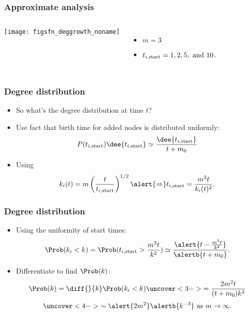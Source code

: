 \begin{frame}[label=]
 \frametitle{Approximate analysis}  

 \begin{columns}
   \texttt{[image: figsfn\_deggrowth\_noname]}
   \begin{itemize}
   \item $m = 3$
   \item $t_{i,\textnormal{start}} = 1, 2, 5, \mbox{\ and\ } 10$.
   \end{itemize}
 \end{columns}

\end{frame}

\begin{frame}[label=]
 \frametitle{Degree distribution}
 
 \begin{itemize}
 \item<1-> 
   So what's the \alert{degree distribution} at time $t$?
 \item<2-> 
   Use fact that birth time for added nodes
   is distributed uniformly:
   $$
   P(t_{i,\textnormal{start}}) \dee{t_{i,\textnormal{start}}}
   \simeq
   \frac{\dee{t_{i,\textnormal{start}}}}
   {t+m_0}
   $$
 \item<3->
   Using
   $$
   k_i(t) 
   = 
   m 
   \left(
   \frac{t}{t_{i,\textnormal{start}}}
   \right)^{1/2}
   \alert{\Rightarrow}
   t_{i,\textnormal{start}}
   = \frac{m^2 t}{k_i(t)^2}.
   $$

 \end{itemize}

\end{frame}

\begin{frame}[label=]
  \frametitle{Degree distribution}

  \begin{itemize}
  \item<1-> 
    Using the uniformity of start times:
    $$
    \Prob(k_i < k)
    =
    \Prob(t_{i,\textnormal{start}} > \frac{m^2 t}{k^2})
    \simeq
    \frac{\alert{t-\frac{m^2 t}{k^2}}}{\alertb{t+m_0}}.
    $$
  \item<2-> 
    Differentiate to find $\Prob(k)$:
    $$
    \Prob(k)
    = 
    \diff{}{k} \Prob(k_i < k)
    \uncover<3->{
      =
      \frac{2m^2 t }{(t+m_0) k^3}
    }
    $$
    $$
    \uncover<4->{
      \sim 
      \alert{2m^2} \alertb{k^{-3}}
      \mbox{\ as $m\rightarrow \infty$}.
    }
    $$
  \end{itemize}

\end{frame}

